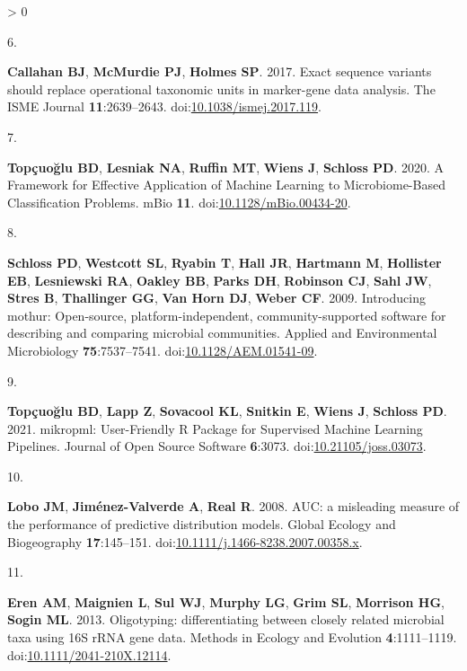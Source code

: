 \documentclass[
]{article}
\newlength{\cslhangindent}
\newlength{\csllabelwidth}
\newenvironment{CSLReferences}[2] %
 {%
  \setlength{\parindent}{0pt}
  \ifodd #1 \everypar{\setlength{\hangindent}{\cslhangindent}}\ignorespaces\fi
  \ifnum #2 > 0
  \setlength{\parskip}{#2\baselineskip}
  \fi
 }%
 {}
\newcommand{\CSLLeftMargin}[1]{\parbox[t]{\csllabelwidth}{#1}}
\newcommand{\CSLRightInline}[1]{\parbox[t]{\linewidth - \csllabelwidth}{#1}\break}
\begin{document}
\begin{CSLReferences}{0}{0}
\leavevmode\hypertarget{ref-callahan2017}{}%
\CSLLeftMargin{6. }
\CSLRightInline{\textbf{Callahan BJ}, \textbf{McMurdie PJ},
\textbf{Holmes SP}. 2017. Exact sequence variants should replace
operational taxonomic units in marker-gene data analysis. The ISME
Journal \textbf{11}:2639--2643.
doi:\href{https://doi.org/10.1038/ismej.2017.119}{10.1038/ismej.2017.119}.}

\leavevmode\hypertarget{ref-topuxe7uolu2020}{}%
\CSLLeftMargin{7. }
\CSLRightInline{\textbf{Topçuoğlu BD}, \textbf{Lesniak NA},
\textbf{Ruffin MT}, \textbf{Wiens J}, \textbf{Schloss PD}. 2020. A
Framework for Effective Application of Machine Learning to
Microbiome-Based Classification Problems. mBio \textbf{11}.
doi:\href{https://doi.org/10.1128/mBio.00434-20}{10.1128/mBio.00434-20}.}

\leavevmode\hypertarget{ref-schloss2009}{}%
\CSLLeftMargin{8. }
\CSLRightInline{\textbf{Schloss PD}, \textbf{Westcott SL},
\textbf{Ryabin T}, \textbf{Hall JR}, \textbf{Hartmann M},
\textbf{Hollister EB}, \textbf{Lesniewski RA}, \textbf{Oakley BB},
\textbf{Parks DH}, \textbf{Robinson CJ}, \textbf{Sahl JW}, \textbf{Stres
B}, \textbf{Thallinger GG}, \textbf{Van Horn DJ}, \textbf{Weber CF}.
2009. Introducing mothur: Open-source, platform-independent,
community-supported software for describing and comparing microbial
communities. Applied and Environmental Microbiology
\textbf{75}:7537--7541.
doi:\href{https://doi.org/10.1128/AEM.01541-09}{10.1128/AEM.01541-09}.}

\leavevmode\hypertarget{ref-topuxe7uolu2021}{}%
\CSLLeftMargin{9. }
\CSLRightInline{\textbf{Topçuoğlu BD}, \textbf{Lapp Z}, \textbf{Sovacool
KL}, \textbf{Snitkin E}, \textbf{Wiens J}, \textbf{Schloss PD}. 2021.
mikropml: User-Friendly R Package for Supervised Machine Learning
Pipelines. Journal of Open Source Software \textbf{6}:3073.
doi:\href{https://doi.org/10.21105/joss.03073}{10.21105/joss.03073}.}

\leavevmode\hypertarget{ref-lobo2008}{}%
\CSLLeftMargin{10. }
\CSLRightInline{\textbf{Lobo JM}, \textbf{Jiménez-Valverde A},
\textbf{Real R}. 2008. AUC: a misleading measure of the performance of
predictive distribution models. Global Ecology and Biogeography
\textbf{17}:145--151.
doi:\href{https://doi.org/10.1111/j.1466-8238.2007.00358.x}{10.1111/j.1466-8238.2007.00358.x}.}

\leavevmode\hypertarget{ref-eren2013}{}%
\CSLLeftMargin{11. }
\CSLRightInline{\textbf{Eren AM}, \textbf{Maignien L}, \textbf{Sul WJ},
\textbf{Murphy LG}, \textbf{Grim SL}, \textbf{Morrison HG},
\textbf{Sogin ML}. 2013. Oligotyping: differentiating between closely
related microbial taxa using 16S rRNA gene data. Methods in Ecology and
Evolution \textbf{4}:1111--1119.
doi:\href{https://doi.org/10.1111/2041-210X.12114}{10.1111/2041-210X.12114}.}


\end{CSLReferences}
\end{document}
